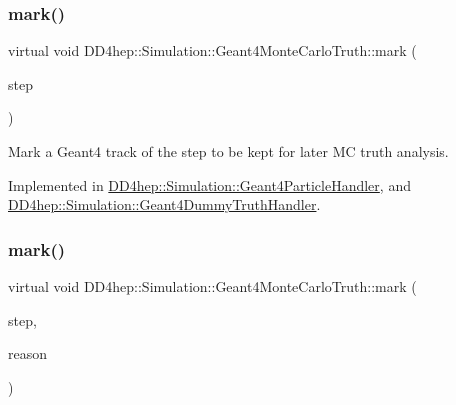 \subsubsection{\texorpdfstring{mark()}{mark()}\hspace{0.1cm}{\footnotesize\ttfamily [3/4]}}
{\footnotesize\ttfamily virtual void D\+D4hep\+::\+Simulation\+::\+Geant4\+Monte\+Carlo\+Truth\+::mark (\begin{DoxyParamCaption}\item[{const G4\+Step $\ast$}]{step }\end{DoxyParamCaption})\hspace{0.3cm}{\ttfamily [pure virtual]}}



Mark a Geant4 track of the step to be kept for later MC truth analysis. 



Implemented in \hyperlink{class_d_d4hep_1_1_simulation_1_1_geant4_particle_handler_aa03024ccc930c57fcfcd515605072f4b}{D\+D4hep\+::\+Simulation\+::\+Geant4\+Particle\+Handler}, and \hyperlink{class_d_d4hep_1_1_simulation_1_1_geant4_dummy_truth_handler_a19f10fada0444ae5f60deb1d92761969}{D\+D4hep\+::\+Simulation\+::\+Geant4\+Dummy\+Truth\+Handler}.

\hypertarget{class_d_d4hep_1_1_simulation_1_1_geant4_monte_carlo_truth_aaa3fb07338363616c0a898d791d24314}{}\label{class_d_d4hep_1_1_simulation_1_1_geant4_monte_carlo_truth_aaa3fb07338363616c0a898d791d24314} 
\subsubsection{\texorpdfstring{mark()}{mark()}\hspace{0.1cm}{\footnotesize\ttfamily [4/4]}}
{\footnotesize\ttfamily virtual void D\+D4hep\+::\+Simulation\+::\+Geant4\+Monte\+Carlo\+Truth\+::mark (\begin{DoxyParamCaption}\item[{const G4\+Step $\ast$}]{step,  }\item[{int}]{reason }\end{DoxyParamCaption})\hspace{0.3cm}{\ttfamily [pure virtual]}}



